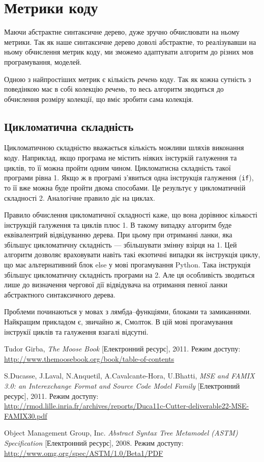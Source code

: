 \documentclass[12pt,a4paper]{article}
\begin{document}
\section{Метрики коду}
Маючи абстрактне синтаксичне дерево, дуже зручно обчислювати на ньому метрики. Так як наше синтаксичне дерево доволі абстрактне, то реалізувавши на ньому обчислення метрик коду, ми зможемо адаптувати алгоритм до різних мов програмування, моделей. 

Одною з найпростіших метрик є кількість \emph{речень} коду. Так як кожна сутність з поведінкою має в собі колекцію \emph{речень}, то весь алгоритм зводиться до обчислення розміру колекції, що вміє зробити сама колекція.

\subsection{Цикломатична складність}
Цикломатичною складністю вважається кількість можливи шляхів виконання коду. Наприклад, якщо програма не містить ніяких інстуркій галуження та циклів, то її можна пройти одним чином. Цикломатисна складність такої програми рівна 1. Якщо ж в програмі з'явиться одна інструкція галуження (\lstinline$if$), то її вже можна буде пройти двома способами. Це результує у цикломатичній складності 2. Аналогічне правило діє на циклах. 

Правило обчислення цикломатичної складності каже, що вона дорівнює кількості інструкцій галуження та циклів плюс 1. В такому випадку алгоритм буде еквівалентрий відвідуванню дерева. При цьому при отриманні ланки, яка збільшує цикломатичну складність --- збільшувати змінну взірця на 1. Цей алгоритм дозволяє враховувати навіть такі екзотичні випадки як інструкція циклу, що має альтернативний блок else у мові прогамування Python. Така інструкція збільшує цикломатичну складність програми на 2. Але ця особливість зводиться лише до визначення чергової дії відвідувача на отримання певної ланки абстрактного синтаксичного дерева.

Проблеми починаються у мовах з лямбда--функціями, блоками та замиканнями. Найкращим прикладом є, звичайно ж, Смолток. В цій мові прогамування інструкії циклів та галуження взагалі відсутні.

\clearpage

\begin{thebibliography}{9}

Tudor Girba, \emph{The Moose Book} [Електронний ресурс],
    2011. Режим доступу:
    \url{http://www.themoosebook.org/book/table-of-contents}

S.Ducasse, J.Laval, N.Anquetil, A.Cavalcante-Hora, U.Bhatti, \emph{MSE and FAMIX 3.0: an Interexchange Format and Source Code Model Family} [Електронний ресурс], 2011. Режим доступу:
    \url{http://rmod.lille.inria.fr/archives/reports/Duca11c-Cutter-deliverable22-MSE-FAMIX30.pdf}
    
Object Management Group, Inc. \emph{Abstract Syntax Tree Metamodel (ASTM) Specification} [Електронний ресурс], 2008. Режим доступу:
    \url{http://www.omg.org/spec/ASTM/1.0/Beta1/PDF}

\end{thebibliography}
\end{document}
